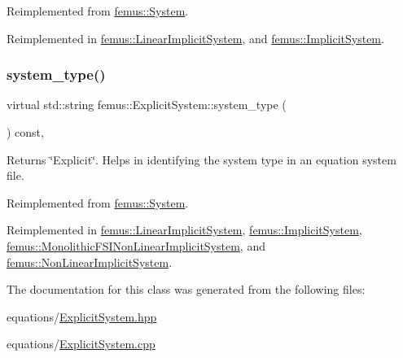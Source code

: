 Reimplemented from \mbox{\hyperlink{classfemus_1_1_system_ae238425d65a58eb22b3925309d9d0bef}{femus\+::\+System}}.



Reimplemented in \mbox{\hyperlink{classfemus_1_1_linear_implicit_system_a821e5e01d07a2124ff6f0130f67b5ba6}{femus\+::\+Linear\+Implicit\+System}}, and \mbox{\hyperlink{classfemus_1_1_implicit_system_a544e5b2b89fd2f8497b3ca6befce74d1}{femus\+::\+Implicit\+System}}.

\mbox{\label{classfemus_1_1_explicit_system_a91f61bd0aa02102fe9af817da96be72b}} 
\subsubsection{\texorpdfstring{system\+\_\+type()}{system\_type()}}
{\footnotesize\ttfamily virtual std\+::string femus\+::\+Explicit\+System\+::system\+\_\+type (\begin{DoxyParamCaption}{ }\end{DoxyParamCaption}) const\hspace{0.3cm}{\ttfamily [inline]}, {\ttfamily [virtual]}}

\begin{DoxyReturn}{Returns}
{\ttfamily \char`\"{}\+Explicit\char`\"{}}. Helps in identifying the system type in an equation system file. 
\end{DoxyReturn}


Reimplemented from \mbox{\hyperlink{classfemus_1_1_system_a8cdcdcaf37dc4985be99dbb0a5ad8efa}{femus\+::\+System}}.



Reimplemented in \mbox{\hyperlink{classfemus_1_1_linear_implicit_system_a45df3966aab87bd06da49c78897a6648}{femus\+::\+Linear\+Implicit\+System}}, \mbox{\hyperlink{classfemus_1_1_implicit_system_aee5e08a09a2d289aa777914018931592}{femus\+::\+Implicit\+System}}, \mbox{\hyperlink{classfemus_1_1_monolithic_f_s_i_non_linear_implicit_system_a29bb0bdaf1eec888af05e8e57469faf4}{femus\+::\+Monolithic\+F\+S\+I\+Non\+Linear\+Implicit\+System}}, and \mbox{\hyperlink{classfemus_1_1_non_linear_implicit_system_a8f4727b8b763bdac9f58b4c9dbb097be}{femus\+::\+Non\+Linear\+Implicit\+System}}.



The documentation for this class was generated from the following files\+:\begin{DoxyCompactItemize}
\item 
equations/\mbox{\hyperlink{_explicit_system_8hpp}{Explicit\+System.\+hpp}}\item 
equations/\mbox{\hyperlink{_explicit_system_8cpp}{Explicit\+System.\+cpp}}\end{DoxyCompactItemize}
